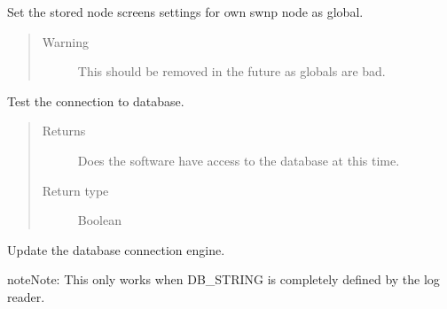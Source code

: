\documentclass[letterpaper,10pt,english]{sphinxmanual}
\begin{document}

\begin{fulllineitems}
\label{controller:controller.common.set_node_screens}
Set the stored node screens settings for own swnp node as global.
\begin{quote}\begin{description}
\item[{Warning }] \leavevmode
This should be removed in the future as globals are bad.

\end{description}\end{quote}

\end{fulllineitems}


\begin{fulllineitems}
\label{controller:controller.common.test_connection}
Test the connection to database.
\begin{quote}\begin{description}
\item[{Returns}] \leavevmode
Does the software have access to the database at this time.

\item[{Return type}] \leavevmode
Boolean

\end{description}\end{quote}

\end{fulllineitems}


\begin{fulllineitems}
\label{controller:controller.common.update_database}
Update the database connection engine.

\begin{notice}{note}{Note:}
This only works when DB\_STRING is completely defined by
the log reader.
\end{notice}

\end{fulllineitems}
\end{document}
